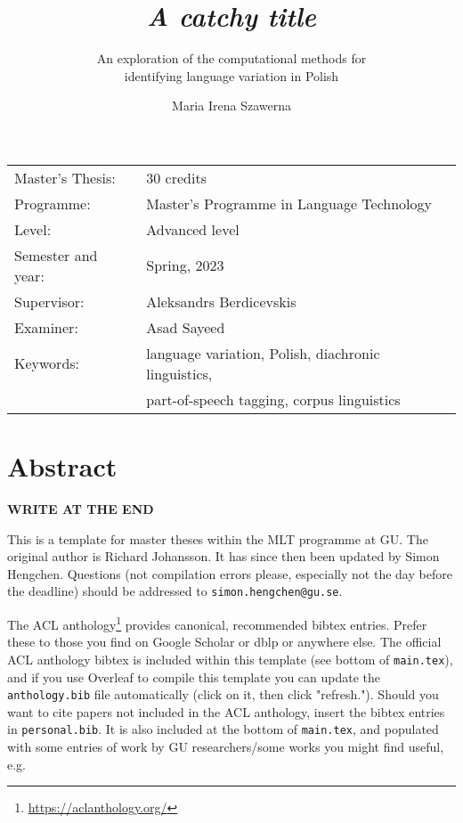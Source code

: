 \documentclass[12pt, a4paper]{article}  %
\title{\textit{A catchy title}}  %
\subtitle{An exploration of the computational methods for \\ identifying language variation in Polish}
\author{Maria Irena Szawerna}
\begin{document}
\begin{titlepage}

\maketitle

\vfill

\begingroup
\renewcommand*{\arraystretch}{1.2}
\begin{tabular}{l@{\hskip 20mm}l}
\hline
Master's Thesis: & 30 credits \\
Programme: & Master’s Programme in Language Technology\\
Level: & Advanced level \\
Semester and year: & Spring, 2023 \\
Supervisor: & Aleksandrs Berdicevskis \\
Examiner: & Asad Sayeed \\ %
Keywords: & language variation, Polish, diachronic linguistics, \\ 
{} & part-of-speech tagging, corpus linguistics %
\end{tabular}
\endgroup

\thispagestyle{empty}
\end{titlepage}

\newpage
\singlespacing
\section*{Abstract}

\textbf{WRITE AT THE END}

This is a template for master theses within the MLT programme at GU. The original author is Richard Johansson. It has since then been updated by Simon Hengchen. Questions (not compilation errors please, especially not the day before the deadline) should be addressed to \texttt{simon.hengchen@gu.se}.

The ACL anthology\footnote{\url{https://aclanthology.org/}} provides canonical, recommended bibtex entries. Prefer these to those you find on Google Scholar or dblp or anywhere else. The official ACL anthology bibtex is included within this template (see bottom of \texttt{main.tex}), and if you use Overleaf to compile this template you can update the \texttt{anthology.bib} file automatically (click on it, then click "refresh."). Should you want to cite papers not included in the ACL anthology, insert the bibtex entries in \texttt{personal.bib}. It is also included at the bottom of \texttt{main.tex}, and populated with some entries of work by GU researchers/some works you might find useful, e.g.
\end{document}
